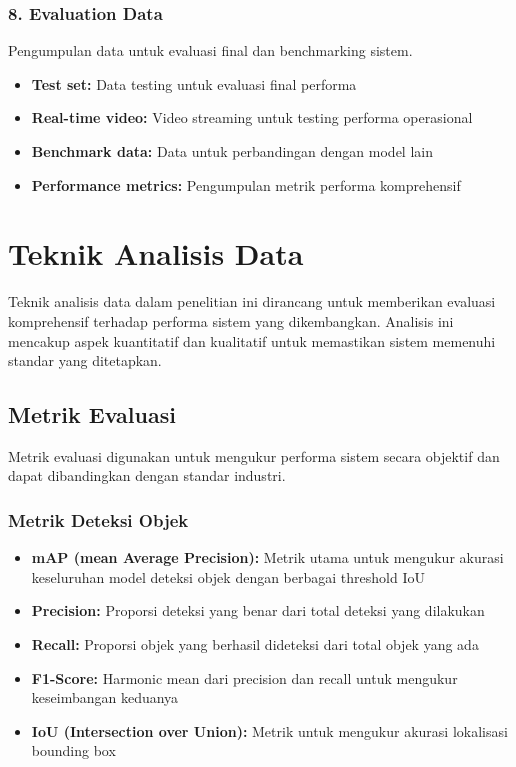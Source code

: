 \documentclass[12pt,a4paper]{report}
\begin{document}
\subsubsection{8. Evaluation Data}

Pengumpulan data untuk evaluasi final dan benchmarking sistem.

\begin{itemize}
    \item \textbf{Test set:} Data testing untuk evaluasi final performa
    \item \textbf{Real-time video:} Video streaming untuk testing performa operasional
    \item \textbf{Benchmark data:} Data untuk perbandingan dengan model lain
    \item \textbf{Performance metrics:} Pengumpulan metrik performa komprehensif
\end{itemize}

\section{Teknik Analisis Data}

Teknik analisis data dalam penelitian ini dirancang untuk memberikan evaluasi komprehensif terhadap performa sistem yang dikembangkan. Analisis ini mencakup aspek kuantitatif dan kualitatif untuk memastikan sistem memenuhi standar yang ditetapkan.

\subsection{Metrik Evaluasi}

Metrik evaluasi digunakan untuk mengukur performa sistem secara objektif dan dapat dibandingkan dengan standar industri.

\subsubsection{Metrik Deteksi Objek}

\begin{itemize}
    \item \textbf{mAP (mean Average Precision):} Metrik utama untuk mengukur akurasi keseluruhan model deteksi objek dengan berbagai threshold IoU
    \item \textbf{Precision:} Proporsi deteksi yang benar dari total deteksi yang dilakukan
    \item \textbf{Recall:} Proporsi objek yang berhasil dideteksi dari total objek yang ada
    \item \textbf{F1-Score:} Harmonic mean dari precision dan recall untuk mengukur keseimbangan keduanya
    \item \textbf{IoU (Intersection over Union):} Metrik untuk mengukur akurasi lokalisasi bounding box
\end{itemize}
\end{document}
